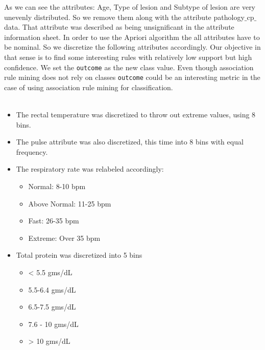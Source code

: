 As we can see the attributes: Age, Type of lesion and Subtype of lesion are very unevenly distributed. So we remove them along with the attribute pathology$\_$cp$\_$data. That attribute was described as being unsignificant in the attribute information sheet.
In order to use the Apriori algorithm the all attributes have to be nominal. So we discretize the following attributes accordingly. Our objective in that sense is to find some interesting rules with relatively low support but high confidence.
We set the \verb|outcome| as the new class value. Even though association rule mining does not rely on classes  \verb|outcome| could be an interesting metric in the case of using association rule mining for classification. \\\\
\begin{itemize}
The outcome values are renamed as:
\begin{itemize}
\item lived
\item died
\item was euthanized
\end{itemize}

\item The rectal temperature was discretized to throw out extreme values, using 8 bins.

\item The pulse attribute was also discretized, this time into 8 bins with equal frequency.

\item The respiratory rate was relabeled accordingly:
\begin{itemize}
\item Normal: 8-10 bpm
\item Above Normal: 11-25 bpm
\item Fast: 26-35 bpm
\item Extreme: Over 35 bpm
\end{itemize}

\item Total protein was discretized into 5 bins
\begin{itemize}
\item < 5.5 gms/dL
\item 5.5-6.4 gms/dL
\item 6.5-7.5 gms/dL
\item 7.6 - 10 gms/dL
\item > 10 gms/dL
\end{itemize}



\end{itemize}
